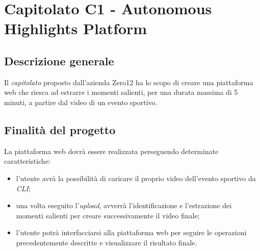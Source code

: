 \section{Capitolato C1 - Autonomous Highlights Platform}

\subsection{Descrizione generale}
Il \textit{capitolato\glo} proposto dall'azienda Zero12 ha lo scopo di creare una piattaforma web che riesca ad estrarre i momenti salienti, per una durata massima di 5 minuti, a partire dal video di un evento sportivo.

\subsection{Finalità del progetto}
La piattaforma web dovrà essere realizzata perseguendo determinate caratteristiche:
\begin{itemize}
	\item l'utente avrà la possibilità di caricare il proprio video dell'evento sportivo da\textit{ CLI\glos};
	\item una volta eseguito l'\textit{upload\glos}, avverrà l'identificazione e l'estrazione dei momenti salienti per creare successivamente il video finale;
	\item l'utente potrà interfacciarsi alla piattaforma web per seguire le operazioni precedentemente descritte e visualizzare il risultato finale.
\end{itemize}

